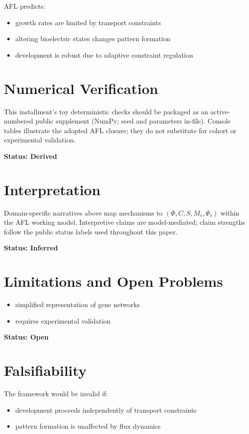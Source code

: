 \documentclass[11pt]{article}
\begin{document}
AFL predicts:

\begin{itemize}
    \item growth rates are limited by transport constraints
    \item altering bioelectric states changes pattern formation
    \item development is robust due to adaptive constraint regulation
\end{itemize}

\section{Numerical Verification}
This installment's toy deterministic checks should be packaged as an active-numbered public supplement (NumPy; seed and parameters in-file). Console tables illustrate the adopted AFL closure; they do not substitute for cohort or experimental validation.

\textbf{Status: Derived}

\section{Interpretation}
Domain-specific narratives above map mechanisms to $(\Phi, C, S, M_s, \Psi_s)$ within the AFL working model. Interpretive claims are model-mediated; claim strengths follow the public status labels used throughout this paper.

\textbf{Status: Inferred}

\section{Limitations and Open Problems}

\begin{itemize}
    \item simplified representation of gene networks
    \item requires experimental validation
\end{itemize}

\textbf{Status: Open}

\section{Falsifiability}

The framework would be invalid if:

\begin{itemize}
    \item development proceeds independently of transport constraints
    \item pattern formation is unaffected by flux dynamics
\end{itemize}
\end{document}
